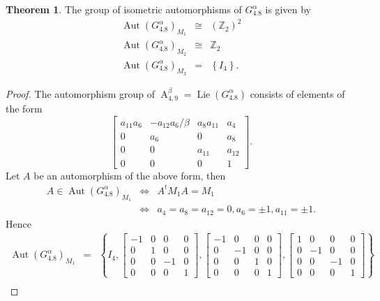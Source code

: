 \documentclass[12pt,a4paper,twoside]{article}
\theoremstyle{definition}
\newtheorem{theorem}{Theorem}[section]
\begin{document}
\begin{theorem}
The group of isometric automorphisms of $G_{4.8}^{\alpha}$ is given by
\begin{eqnarray*}
\operatorname{Aut}\left(G_{4.8}^{\alpha}\right)_{M_1}  &\cong& (\mathbb{Z}_2)^2\\
\operatorname{Aut}\left(G_{4.8}^{\alpha}\right)_{M_2}  &\cong& \mathbb{Z}_2\\
\operatorname{Aut}\left(G_{4.8}^{\alpha}\right)_{M_3}  &=& \left\lbrace I_4\right\rbrace.
\end{eqnarray*}
\end{theorem}
\begin{proof}
The automorphism group of $\operatorname{A}_{4, 9}^{\beta} = \operatorname{Lie}(G_{4.8}^{\alpha})$ consists of elements of the form \cite{christodoulakis2003automorphisms}
$$\begin{bmatrix}
a_{11}a_6 & -a_{12}a_6/\beta & a_8a_{11}& a_4\\
0 & a_6 & 0 & a_8\\
0 & 0 & a_{11} & a_{12}\\
0 & 0 & 0 & 1
\end{bmatrix}.$$
Let $A$ be an automorphism of the above form, then
\begin{eqnarray*}
A \in \operatorname{Aut}\left(G_{4.8}^{\alpha}\right)_{M_1} &\Leftrightarrow& A^tM_1A = M_1\\
&\Leftrightarrow& a_4 = a_8 = a_{12} = 0, a_6 = \pm1, a_{11} = \pm1.
\end{eqnarray*}
Hence 
\begin{eqnarray*}
\operatorname{Aut}\left(G_{4.8}^{\alpha}\right)_{M_1} &=& \left\lbrace I_4, \begin{bmatrix}
-1 & 0 & 0 & 0\\
0 & 1 & 0 & 0\\
0 & 0 & -1 & 0\\
0 & 0 & 0 & 1
\end{bmatrix}, \begin{bmatrix}
-1 & 0 & 0 & 0\\
0 & -1 & 0 & 0\\
0 & 0 & 1 & 0\\
0 & 0 & 0 & 1
\end{bmatrix}, \begin{bmatrix}
1 & 0 & 0 & 0\\
0 & -1 & 0 & 0\\
0 & 0 & -1 & 0\\
0 & 0 & 0 & 1
\end{bmatrix} \right\rbrace\\

\end{eqnarray*}
\end{proof}
\end{document}
